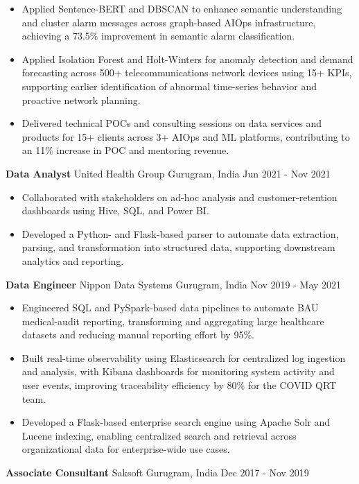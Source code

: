 \documentclass[10pt,a4paper]{article}
\newcommand{\role}[4]{\textbf{#1} \textbar{} #2 \hfill #3 \textbar{} #4\par}
\begin{document}
\begin{itemize}
  \item Applied Sentence-BERT and DBSCAN to enhance semantic understanding and cluster alarm messages across graph-based AIOps infrastructure, achieving a 73.5\% improvement in semantic alarm classification.
  \item Applied Isolation Forest and Holt-Winters for anomaly detection and demand forecasting across 500+ telecommunications network devices using 15+ KPIs, supporting earlier identification of abnormal time-series behavior and proactive network planning.
  \item Delivered technical POCs and consulting sessions on data services and products for 15+ clients across 3+ AIOps and ML platforms, contributing to an 11\% increase in POC and mentoring revenue.
\end{itemize}
\vspace{3pt}
\role{Data Analyst}{United Health Group}{Gurugram, India}{Jun 2021 - Nov 2021}
\begin{itemize}
  \item Collaborated with stakeholders on ad-hoc analysis and customer-retention dashboards using Hive, SQL, and Power BI.
  \item Developed a Python- and Flask-based parser to automate data extraction, parsing, and transformation into structured data, supporting downstream analytics and reporting.
\end{itemize}
\vspace{3pt}
\role{Data Engineer}{Nippon Data Systems}{Gurugram, India}{Nov 2019 - May 2021}
\begin{itemize}
  \item Engineered SQL and PySpark-based data pipelines to automate BAU medical-audit reporting, transforming and aggregating large healthcare datasets and reducing manual reporting effort by 95\%.
  \item Built real-time observability using Elasticsearch for centralized log ingestion and analysis, with Kibana dashboards for monitoring system activity and user events, improving traceability efficiency by 80\% for the COVID QRT team.
  \item Developed a Flask-based enterprise search engine using Apache Solr and Lucene indexing, enabling centralized search and retrieval across organizational data for enterprise-wide use cases.
\end{itemize}
\vspace{3pt}
\role{Associate Consultant}{Saksoft}{Gurugram, India}{Dec 2017 - Nov 2019}
\end{document}
